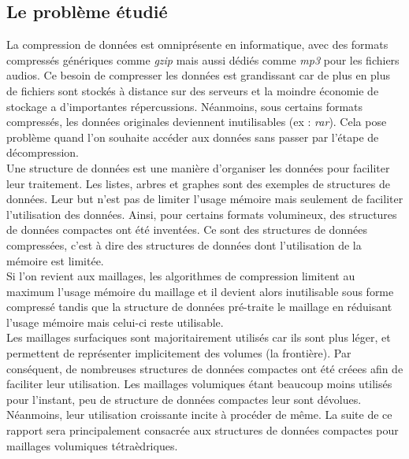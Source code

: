 \subsection*{Le problème étudié}
\noindent
La compression de données est omniprésente en informatique, avec des formats compressés génériques comme \textit{gzip} mais aussi dédiés comme \textit{mp3} pour les fichiers audios. Ce besoin de compresser les données est grandissant car de plus en plus de fichiers sont stockés à distance sur des serveurs et la moindre économie de stockage a d'importantes répercussions. Néanmoins, sous certains formats compressés, les données originales deviennent inutilisables (ex : \textit{rar}). Cela pose problème quand l'on souhaite accéder aux données  sans passer par l'étape de décompression.\\
Une structure de données est une manière d'organiser les données pour faciliter leur traitement. Les listes, arbres et graphes sont des exemples de structures de données. Leur but n'est pas de limiter l'usage mémoire mais seulement de faciliter l'utilisation des données. Ainsi, pour certains formats volumineux, des structures de données compactes ont été inventées. Ce sont des structures de données compressées, c'est à dire des structures de données dont l'utilisation de la mémoire est limitée.\\
Si l'on revient aux maillages, les algorithmes de compression limitent au maximum l'usage mémoire du maillage et il devient alors inutilisable sous forme compressé tandis que la structure de données pré-traite le maillage en réduisant l'usage mémoire mais celui-ci reste utilisable.\\ 
Les maillages surfaciques sont majoritairement utilisés car ils sont plus léger, et permettent de représenter implicitement des volumes (la frontière). Par conséquent, de nombreuses structures de données compactes ont été créees afin de faciliter leur utilisation. Les maillages volumiques étant beaucoup moins utilisés pour l'instant, peu de structure de données compactes leur sont dévolues. Néanmoins, leur utilisation croissante incite à procéder de même. La suite de ce rapport sera principalement consacrée aux structures de données compactes pour maillages volumiques tétraèdriques.

